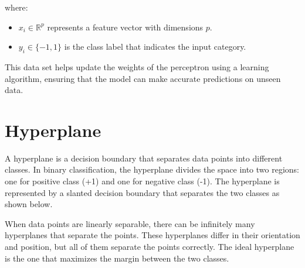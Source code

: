 where:

\begin{itemize}
    \item \( x_i \in \mathbb{R}^p \) represents a feature vector with dimensions \( p \).
    \item \( y_i \in \{-1, 1\} \) is the class label that indicates the input category.
\end{itemize}

This data set helps update the weights of the perceptron using a learning algorithm, ensuring that the model can make accurate predictions on unseen data.


\section{Hyperplane}

A hyperplane is a decision boundary that separates data points into different classes. In binary classification, the hyperplane divides the space into two regions: one for positive class (+1) and one for negative class (-1). The hyperplane is represented by a slanted decision boundary that separates the two classes as shown below. 

\begin{center}
\end{center}

When data points are linearly separable, there can be infinitely many hyperplanes that separate the points. These hyperplanes differ in their orientation and position, but all of them separate the points correctly. The ideal hyperplane is the one that maximizes the margin between the two classes.

